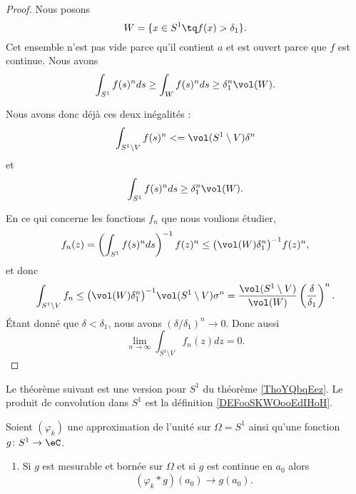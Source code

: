 \begin{proof}
    Nous posons
    \begin{equation}
        W=\{ x\in S^1\tq f(x)>\delta_1 \}.
    \end{equation}
    Cet ensemble n'est pas vide parce qu'il contient \( a\) et est ouvert parce que \( f\) est continue. Nous avons
    \begin{equation}
        \int_{S^1}f(s)^nds\geq \int_{W}f(s)^nds\geq \delta_1^n\vol(W).
    \end{equation}
    
    Nous avons donc déjà ces deux inégalités :
    \begin{equation}
        \int_{S^1\setminus V}f(s)^n<=\vol(S^1\setminus V)\delta^n
    \end{equation}
    et
    \begin{equation}
        \int_{S^1}f(s)^nds\geq \delta_1^n\vol(W).
    \end{equation}

    En ce qui concerne les fonctions \( f_n\) que nous voulions étudier,
    \begin{equation}
        f_n(z)=\left( \int_{S^1}f(s)^nds \right)^{-1}f(z)^n\leq \big( \vol(W)\delta_1^n \big)^{-1}f(z)^n,
    \end{equation}
    et donc
    \begin{equation}
        \int_{S^1\setminus V}f_n\leq\big( \vol(W)\delta_1^n \big)^{-1}\vol(S^1\setminus V)\sigma^n=\frac{ \vol(S^1\setminus V) }{ \vol(W) }\left( \frac{ \delta }{ \delta_1 } \right)^n.
    \end{equation}
    Étant donné que \( \delta<\delta_1\), nous avons \( (\delta/\delta_1)^n\to 0\). Donc aussi
    \begin{equation}
        \lim_{n\to \infty} \int_{S^1\setminus V}f_n(z)dz=0.
    \end{equation}
\end{proof}

Le théorème suivant est une version pour \( S^1\) du théorème \ref{ThoYQbqEez}. Le produit de convolution dans \( S^1\) est la définition \ref{DEFooSKWOooEdIHoH}.
\begin{theorem}         \label{THOooIAOPooELSNxq}
    Soient \( (\varphi_k)\) une approximation de l'unité sur \( \Omega=S^1\) ainsi qu'une fonction \( g\colon S^1\to \eC\).
    \begin{enumerate}
        \item       \label{ITEMooNUDFooYLFIwR}
            Si \( g\) est mesurable et bornée sur \( \Omega\) et si \( g\) est continue en \( a_0\) alors
            \begin{equation}
                (\varphi_k*g)(a_0)\to g(a_0).
            \end{equation}
    \end{enumerate}
\end{theorem}

